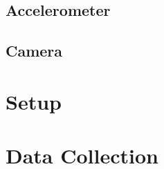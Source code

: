 \subsection{Accelerometer}  
      

\subsection{Camera}    
 
\section{Setup}

\section{Data Collection}

